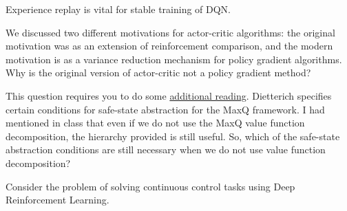 \documentclass[solution,addpoints,12pt]{exam}
\begin{document}
\begin{questions}
\begin{itemize}
\begin{solution}
    \end{solution}
\end{itemize}

\question[4] Experience replay is vital for stable training of DQN.

\question[3] We discussed two different motivations for actor-critic algorithms: the original motivation was as an extension of reinforcement comparison, and the modern motivation is as a variance reduction mechanism for policy gradient algorithms. Why is the original version
of actor-critic not a policy gradient method?
\begin{solution}

\end{solution}


\question[4]
This question requires you to do some \href{https://arxiv.org/abs/cs/9905014}{additional reading}.  Dietterich specifies certain conditions for safe-state abstraction for the MaxQ framework.  I had mentioned in class that even if we do not use the MaxQ value function decomposition, the hierarchy provided is still useful.  So, which of the safe-state abstraction conditions are still necessary when we do not use value function decomposition?
\begin{solution}

\end{solution}

\question[3] Consider the problem of solving continuous control tasks using Deep Reinforcement Learning.


\end{questions}
\end{document}
